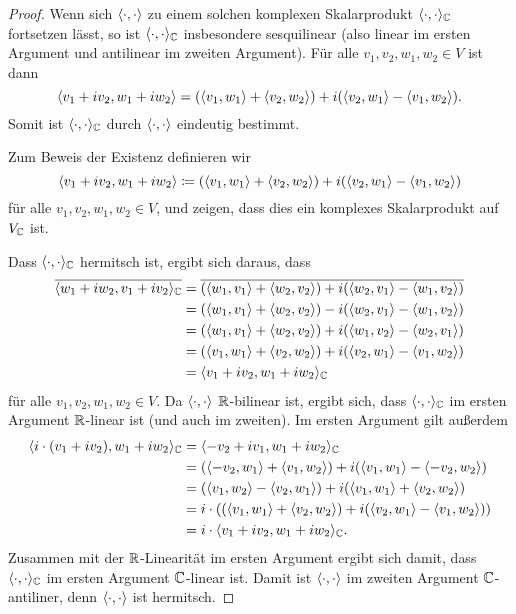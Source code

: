 \documentclass[a4paper,10pt]{article}
\begin{document}
\begin{proof}
  Wenn sich $\langle \cdot, \cdot \rangle$ zu einem solchen komplexen Skalarprodukt $\langle \cdot, \cdot \rangle_{\mathbb{C}}$ fortsetzen lässt, so ist $\langle \cdot, \cdot \rangle_{\mathbb{C}}$ insbesondere sesquilinear (also linear im ersten Argument und antilinear im zweiten Argument).
  Für alle $v_1, v_2, w_1, w_2 \in V$ ist dann
  \[
      \langle v_1 + i v_2, w_1 + i w_2 \rangle
    = ( \langle v_1, w_1 \rangle + \langle v_2, w_2 \rangle ) + i( \langle v_2, w_1 \rangle - \langle v_1, w_2 \rangle ).
  \]
  Somit ist $\langle \cdot, \cdot \rangle_{\mathbb{C}}$ durch $\langle \cdot, \cdot \rangle$ eindeutig bestimmt.
  
  Zum Beweis der Existenz definieren wir
  \[
              \langle v_1 + iv_2, w_1 + iw_2 \rangle
    \coloneqq ( \langle v_1, w_1 \rangle + \langle v_2, w_2 \rangle ) + i(\langle v_2, w_1 \rangle - \langle v_1, w_2 \rangle )
  \]
  für alle $v_1, v_2, w_1, w_2 \in V$, und zeigen, dass dies ein komplexes Skalarprodukt auf $V_{\mathbb{C}}$ ist.
  
  Dass $\langle \cdot, \cdot \rangle_{\mathbb{C}}$ hermitsch ist, ergibt sich daraus, dass
  \begin{align*}
      \overline{ \langle w_1 + i w_2, v_1 + i v_2 \rangle_{\mathbb{C}} }
    &= \overline{ ( \langle w_1, v_1 \rangle + \langle w_2, v_2 \rangle ) + i( \langle w_2, v_1 \rangle - \langle w_1, v_2 \rangle ) } \\
    &= ( \langle w_1, v_1 \rangle + \langle w_2, v_2 \rangle ) - i( \langle w_2, v_1 \rangle - \langle w_1, v_2 \rangle ) \\
    &= ( \langle w_1, v_1 \rangle + \langle w_2, v_2 \rangle ) + i( \langle w_1, v_2 \rangle - \langle w_2, v_1 \rangle ) \\
    &= ( \langle v_1, w_1 \rangle + \langle v_2, w_2 \rangle ) + i( \langle v_2, w_1 \rangle - \langle v_1, w_2 \rangle ) \\
    &= \langle v_1 + i v_2, w_1 + i w_2 \rangle_{\mathbb{C}}
  \end{align*}
  für alle $v_1, v_2, w_1, w_2 \in V$.
  Da $\langle \cdot, \cdot \rangle$ $\mathbb{R}$-bilinear ist, ergibt sich, dass $\langle \cdot, \cdot \rangle_{\mathbb{C}}$ im ersten Argument $\mathbb{R}$-linear ist (und auch im zweiten).
  Im ersten Argument gilt außerdem
  \begin{align*}
      \langle i \cdot (v_1 + i v_2), w_1 + i w_2 \rangle_{\mathbb{C}}
    &= \langle - v_2 + i v_1, w_1 + i w_2 \rangle_{\mathbb{C}}  \\
    &= (\langle - v_2, w_1 \rangle + \langle v_1, w_2 \rangle) + i(\langle v_1, w_1 \rangle - \langle -v_2, w_2 \rangle) \\
    &= (\langle v_1, w_2 \rangle - \langle v_2, w_1 \rangle) + i(\langle v_1, w_1 \rangle + \langle v_2, w_2 \rangle) \\
    &= i \cdot ( (\langle v_1, w_1 \rangle + \langle v_2, w_2 \rangle) + i (\langle v_2, w_1 \rangle - \langle v_1, w_2 \rangle) )  \\
    &= i \cdot \langle v_1 + i v_2, w_1 + i w_2 \rangle_{\mathbb{C}}.
  \end{align*}
  Zusammen mit der $\mathbb{R}$-Linearität im ersten Argument ergibt sich damit, dass $\langle \cdot, \cdot \rangle_{\mathbb{C}}$ im ersten Argument $\mathbb{C}$-linear ist.
  Damit ist $\langle \cdot, \cdot \rangle$ im zweiten Argument $\mathbb{C}$-antiliner, denn $\langle \cdot, \cdot \rangle$ ist hermitsch.
  

\end{proof}
\end{document}
